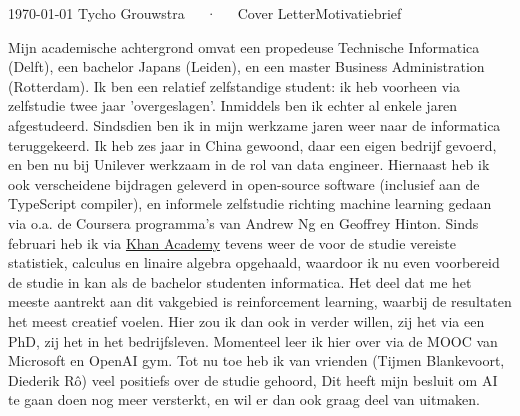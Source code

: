 \documentclass[11pt, a4paper]{awesome-cv}
\newcommand{\langen}[1]{\ifen#1\fi}
\newcommand{\langnl}[1]{\ifnl#1\fi}
\begin{document}
  \langen{}
  \langnl{}
  \makecvheader[R]
  \makecvfooter
    {\today}
    {Tycho Grouwstra~~~·~~~\langen{Cover Letter}\langnl{Motivatiebrief}}
    {}
  \makelettertitle
  
  \begin{cvletter}

  Mijn academische achtergrond omvat een propedeuse Technische Informatica (Delft),
  een bachelor Japans (Leiden), en een master Business Administration (Rotterdam).
  \newline\newline
  Ik ben een relatief zelfstandige student: ik heb voorheen via zelfstudie twee jaar 'overgeslagen'.
  Inmiddels ben ik echter al enkele jaren afgestudeerd.
  \newline\newline
  Sindsdien ben ik in mijn werkzame jaren weer naar de informatica teruggekeerd.
  Ik heb zes jaar in China gewoond, daar een eigen bedrijf gevoerd,
  en ben nu bij Unilever werkzaam in de rol van data engineer.
  \newline\newline
  Hiernaast heb ik ook verscheidene bijdragen geleverd in
  open-source software (inclusief aan de TypeScript compiler),
  en informele zelfstudie richting machine learning gedaan via
  o.a. de Coursera programma's van Andrew Ng en Geoffrey Hinton.
  \newline\newline
  Sinds februari heb ik via \href{https://www.khanacademy.org/profile/tycho01/}{Khan Academy} tevens weer 
  de voor de studie vereiste statistiek, calculus en linaire algebra opgehaald,
  waardoor ik nu even voorbereid de studie in kan als de bachelor studenten informatica. 
  \newline\newline
  Het deel dat me het meeste aantrekt aan dit vakgebied is reinforcement learning,
  waarbij de resultaten het meest creatief voelen.
  Hier zou ik dan ook in verder willen, zij het via een PhD, zij het in het bedrijfsleven.
  Momenteel leer ik hier over via de MOOC van Microsoft en OpenAI gym.
  \newline\newline
  Tot nu toe heb ik van vrienden (Tijmen Blankevoort, Diederik Rô) veel positiefs over de studie gehoord,
  Dit heeft mijn besluit om AI te gaan doen nog meer versterkt,
  en wil er dan ook graag deel van uitmaken.
  
  \end{cvletter}
  \makeletterclosing
  
\end{document}
